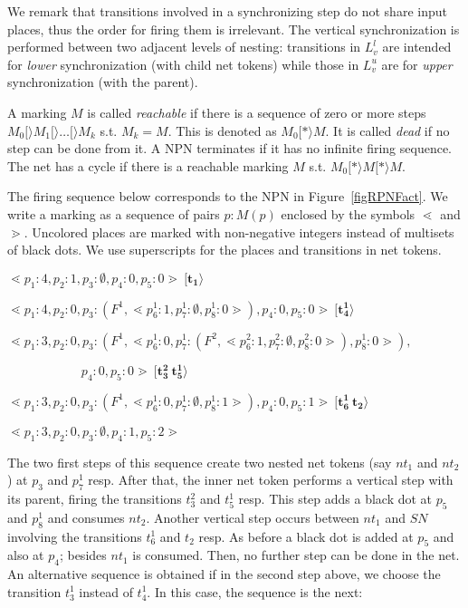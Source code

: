 \documentclass{llncs}
\begin{document}
We remark that transitions involved in a synchronizing step do not share input places, thus the order for firing them is irrelevant. The vertical synchronization is performed between two adjacent levels of nesting: transitions in $L_v^l$ are intended for \emph{lower} synchronization (with child net tokens) while those in $L_v^u$ are for \emph{upper} synchronization (with the parent). 


A marking $M$ is called \emph{reachable} if there is a sequence of zero or more steps  $M_0[\rangle M_1 [\rangle \ldots[\rangle M_k$ s.t. $M_k=M$. This is denoted as $M_0[*\rangle M$. It is called \emph{dead} if no step can be done from it.  A NPN terminates if it has no infinite firing sequence.  The net has a cycle if there is a reachable marking $M$ s.t. $M_0[*\rangle M[*\rangle M$.


\begin{example}
The firing sequence below corresponds to the NPN in Figure~\ref{figRPNFact}. We write a marking as a sequence of pairs $p:M(p)$ enclosed by the symbols $\lessdot$ and $\gtrdot$. Uncolored places are marked with non-negative integers instead of multisets of black dots. We use superscripts for the places and transitions in net tokens.

\vspace{7pt}
$\lessdot p_1:4,p_2:1,p_3:\emptyset, p_4:0,p_5:0\gtrdot\ \mathbf{[t_1\rangle}$

$\lessdot p_1:4,p_2:0, p_3:(F^1,\lessdot p_6^1:1,p_7^1:\emptyset,p_8^1:0\gtrdot),p_4:0,p_5:0\gtrdot\ \mathbf{[t^1_4\rangle}\ $

$\lessdot p_1:3,p_2:0, p_3:(F^1,\lessdot p_6^1:0,p_7^1:(F^2,\lessdot p_6^2:1,p_7^2:\emptyset,p_8^2:0\gtrdot),p_8^1:0\gtrdot),$

\verb"           " $\ p_4:0,p_5:0\gtrdot\ \mathbf{[t^2_3\ t^1_5\rangle}\ $

$\lessdot p_1:3, p_2:0, p_3:(F^1,\lessdot p_6^1:0,p_7^1:\emptyset,p_8^1:1\gtrdot),p_4:0,p_5:1\gtrdot\ \mathbf{[t^1_6\ t_2\rangle}$

$\lessdot p_1:3,p_2:0,p_3:\emptyset, p_4:1,p_5:2\gtrdot $
\vspace{7pt}

The two first steps of this sequence create two nested net tokens (say $nt_1$ and $nt_2$) at $p_3$ and $p_7^1$ resp. After that, the inner net token performs a vertical step with its parent, firing the transitions $t^2_3$ and $t^1_5$ resp. This step adds a black dot at $p_5$ and $p_8^1$ and consumes $nt_2$. Another vertical step occurs between $nt_1$ and $SN$ involving the transitions $t^1_6$ and $t_2$ resp. As before a black dot is added at $p_5$ and also at $p_4$; besides $nt_1$ is consumed. Then, no further step can be done in the net. An alternative sequence is obtained if in the second step above, we choose the transition $t_3^1$ instead of $t_4^1$. In this case, the sequence is the next:


\end{example}
\end{document}

